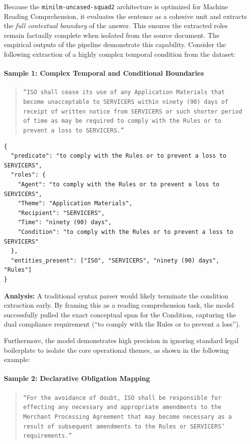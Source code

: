 \documentclass[twoside,final]{hcmut-report}
\begin{document}
\medskip

Because the \texttt{minilm-uncased-squad2} architecture is optimized for Machine Reading Comprehension, it evaluates the sentence as a cohesive unit and extracts the \emph{full contextual boundary} of the answer. This ensures the extracted roles remain factually complete when isolated from the source document. The empirical outputs of the pipeline demonstrate this capability. Consider the following extraction of a highly complex temporal condition from the dataset:

\paragraph{Sample 1: Complex Temporal and Conditional Boundaries}
\begin{quote}
  \texttt{``ISO shall cease its use of any Application Materials that become unacceptable to SERVICERS within ninety (90) days of receipt of written notice from SERVICERS or such shorter period of time as may be required to comply with the Rules or to prevent a loss to SERVICERS.''}
\end{quote}

\begin{verbatim}
{
  "predicate": "to comply with the Rules or to prevent a loss to SERVICERS",
  "roles": {
    "Agent": "to comply with the Rules or to prevent a loss to SERVICERS",
    "Theme": "Application Materials",
    "Recipient": "SERVICERS",
    "Time": "ninety (90) days",
    "Condition": "to comply with the Rules or to prevent a loss to SERVICERS"
  },
  "entities_present": ["ISO", "SERVICERS", "ninety (90) days", "Rules"]
}
\end{verbatim}

\noindent\textbf{Analysis:} A traditional syntax parser would likely terminate the condition extraction early. By framing this as a reading comprehension task, the model successfully pulled the exact conceptual span for the Condition, capturing the dual compliance requirement (``to comply with the Rules or to prevent a loss'').

\medskip

Furthermore, the model demonstrates high precision in ignoring standard legal boilerplate to isolate the core operational themes, as shown in the following example:

\paragraph{Sample 2: Declarative Obligation Mapping}
\begin{quote}
  \texttt{``For the avoidance of doubt, ISO shall be responsible for effecting any necessary and appropriate amendments to the Merchant Processing Agreement that may become necessary as a result of subsequent amendments to the Rules or SERVICERS' requirements.''}
\end{quote}
\end{document}
